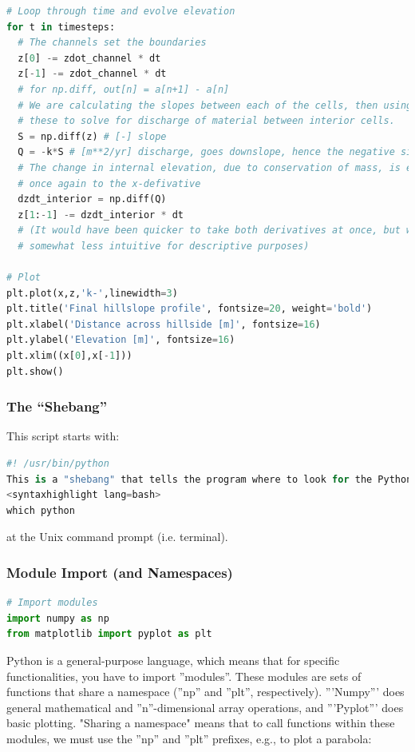 \documentclass[a4paper,10pt]{scrartcl}
\begin{document}
\begin{lstlisting}[language=Python]
# Loop through time and evolve elevation
for t in timesteps:
  # The channels set the boundaries
  z[0] -= zdot_channel * dt
  z[-1] -= zdot_channel * dt
  # for np.diff, out[n] = a[n+1] - a[n]
  # We are calculating the slopes between each of the cells, then using 
  # these to solve for discharge of material between interior cells.
  S = np.diff(z) # [-] slope
  Q = -k*S # [m**2/yr] discharge, goes downslope, hence the negative sign # POSITIVE - WHY? CANCELLED OUT AGAIN!
  # The change in internal elevation, due to conservation of mass, is equal 
  # once again to the x-defivative
  dzdt_interior = np.diff(Q)
  z[1:-1] -= dzdt_interior * dt
  # (It would have been quicker to take both derivatives at once, but would be 
  # somewhat less intuitive for descriptive purposes)

# Plot
plt.plot(x,z,'k-',linewidth=3)
plt.title('Final hillslope profile', fontsize=20, weight='bold')
plt.xlabel('Distance across hillside [m]', fontsize=16)
plt.ylabel('Elevation [m]', fontsize=16)
plt.xlim((x[0],x[-1]))
plt.show()
\end{lstlisting}

\subsubsection{The ``Shebang''}

This script starts with:
\begin{lstlisting}[language=Python]
#! /usr/bin/python
This is a "shebang" that tells the program where to look for the Python interpreter on Unix-like systems (the most popular being Mac and Linux, the former more popular for desktop applications and the latter more popular for supercomputers). You can find where Python is located by typing:
<syntaxhighlight lang=bash>
which python
\end{lstlisting}
at the Unix command prompt (i.e. terminal).

\subsubsection{Module Import (and Namespaces)}
\begin{lstlisting}[language=Python]
# Import modules
import numpy as np
from matplotlib import pyplot as plt
\end{lstlisting}

Python is a general-purpose language, which means that for specific functionalities, you have to import ''modules''. These modules are sets of functions that share a namespace (''np'' and ''plt'', respectively). '''Numpy''' does general mathematical and ''n''-dimensional array operations, and '''Pyplot''' does basic plotting. "Sharing a namespace" means that to call functions within these modules, we must use the ''np'' and ''plt'' prefixes, e.g., to plot a parabola:
\end{document}
